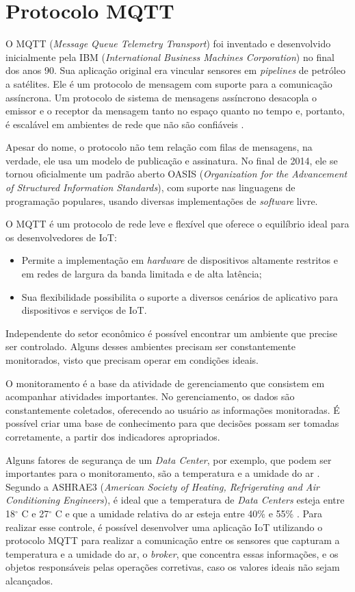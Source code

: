 \documentclass[
12pt,
openany, %
oneside, %
a4paper,			
english,			
brazil			        %
]{abntbibufjf}
\begin{document}
	
	\section{Protocolo MQTT}
	
	O MQTT (\textit{Message Queue Telemetry Transport}) foi inventado e desenvolvido inicialmente pela IBM (\textit{International Business Machines Corporation}) no final dos anos 90. Sua aplicação original era vincular sensores em \textit{pipelines} de petróleo a satélites. Ele é um protocolo de mensagem com suporte para a comunicação assíncrona. Um protocolo de sistema de mensagens assíncrono desacopla o emissor e o receptor da mensagem tanto no espaço quanto no tempo e, portanto, é escalável em ambientes de rede que não são confiáveis \cite{IBM}.
	
	Apesar do nome, o protocolo não tem relação com filas de mensagens, na verdade, ele usa um modelo de publicação e assinatura. No final de 2014, ele se tornou oficialmente um padrão aberto OASIS (\textit{Organization for the Advancement of Structured Information Standards}), com suporte nas linguagens de programação populares, usando diversas implementações de \textit{software} livre.
	
	O MQTT é um protocolo de rede leve e flexível que oferece o equilíbrio ideal para os desenvolvedores de IoT:

\begin{itemize}
    \item Permite a implementação em \textit{hardware} de dispositivos altamente restritos e em redes de largura da banda limitada e de alta latência;
    \item Sua flexibilidade possibilita o suporte a diversos cenários de aplicativo para dispositivos e serviços de IoT.
\end{itemize}


	Independente do setor econômico é possível encontrar um ambiente que precise ser controlado. Alguns desses ambientes precisam ser constantemente monitorados, visto que precisam operar em condições ideais.
	
	O monitoramento é a base da atividade de gerenciamento que consistem em acompanhar atividades importantes. No gerenciamento, os dados são constantemente coletados, oferecendo ao usuário as informações monitoradas. É possível criar uma base de conhecimento para que decisões possam ser tomadas corretamente, a partir dos indicadores apropriados.
	
	Alguns fatores de segurança de um \textit{Data Center}, por exemplo, que podem ser importantes para o monitoramento, são a temperatura e a umidade do ar \cite{ZUCCHI}. Segundo a ASHRAE3 (\textit{American Society of Heating, Refrigerating and Air Conditioning Engineers}), é ideal que a temperatura de \textit{Data Centers} esteja entre 18$^{\circ}$ C e 27$^{\circ}$ C e que a umidade relativa do ar esteja entre 40\% e 55\% \cite{ZEITTEC}. Para realizar esse controle, é possível desenvolver uma aplicação IoT utilizando o protocolo MQTT para realizar a comunicação entre os sensores que capturam a temperatura e a umidade do ar, o \textit{broker}, que concentra essas informações, e os objetos responsáveis pelas operações corretivas, caso os valores ideais não sejam alcançados.
\end{document}
